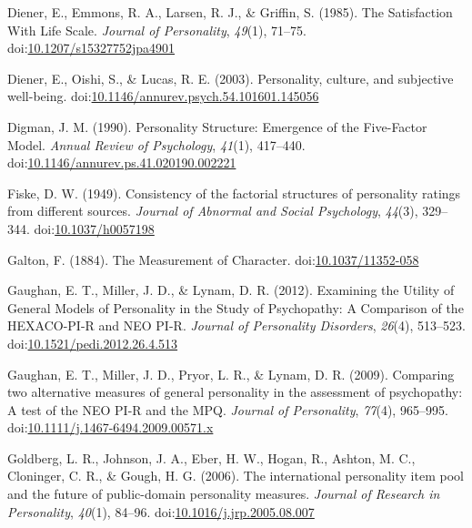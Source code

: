 \documentclass[,man,floatsintext]{apa6}
\begin{document}
\hypertarget{ref-Diener1985}{}
Diener, E., Emmons, R. A., Larsen, R. J., \& Griffin, S. (1985). The
Satisfaction With Life Scale. \emph{Journal of Personality},
\emph{49}(1), 71--75.
doi:\href{https://doi.org/10.1207/s15327752jpa4901}{10.1207/s15327752jpa4901}

\hypertarget{ref-Diener2003}{}
Diener, E., Oishi, S., \& Lucas, R. E. (2003). Personality, culture, and
subjective well-being.
doi:\href{https://doi.org/10.1146/annurev.psych.54.101601.145056}{10.1146/annurev.psych.54.101601.145056}

\hypertarget{ref-Digman1990}{}
Digman, J. M. (1990). Personality Structure: Emergence of the
Five-Factor Model. \emph{Annual Review of Psychology}, \emph{41}(1),
417--440.
doi:\href{https://doi.org/10.1146/annurev.ps.41.020190.002221}{10.1146/annurev.ps.41.020190.002221}

\hypertarget{ref-Fiske1949}{}
Fiske, D. W. (1949). Consistency of the factorial structures of
personality ratings from different sources. \emph{Journal of Abnormal
and Social Psychology}, \emph{44}(3), 329--344.
doi:\href{https://doi.org/10.1037/h0057198}{10.1037/h0057198}

\hypertarget{ref-Galton1884}{}
Galton, F. (1884). The Measurement of Character.
doi:\href{https://doi.org/10.1037/11352-058}{10.1037/11352-058}

\hypertarget{ref-Gaughan2012}{}
Gaughan, E. T., Miller, J. D., \& Lynam, D. R. (2012). Examining the
Utility of General Models of Personality in the Study of Psychopathy: A
Comparison of the HEXACO-PI-R and NEO PI-R. \emph{Journal of Personality
Disorders}, \emph{26}(4), 513--523.
doi:\href{https://doi.org/10.1521/pedi.2012.26.4.513}{10.1521/pedi.2012.26.4.513}

\hypertarget{ref-Gaughan2009}{}
Gaughan, E. T., Miller, J. D., Pryor, L. R., \& Lynam, D. R. (2009).
Comparing two alternative measures of general personality in the
assessment of psychopathy: A test of the NEO PI-R and the MPQ.
\emph{Journal of Personality}, \emph{77}(4), 965--995.
doi:\href{https://doi.org/10.1111/j.1467-6494.2009.00571.x}{10.1111/j.1467-6494.2009.00571.x}

\hypertarget{ref-Goldberg2006}{}
Goldberg, L. R., Johnson, J. A., Eber, H. W., Hogan, R., Ashton, M. C.,
Cloninger, C. R., \& Gough, H. G. (2006). The international personality
item pool and the future of public-domain personality measures.
\emph{Journal of Research in Personality}, \emph{40}(1), 84--96.
doi:\href{https://doi.org/10.1016/j.jrp.2005.08.007}{10.1016/j.jrp.2005.08.007}
\end{document}
